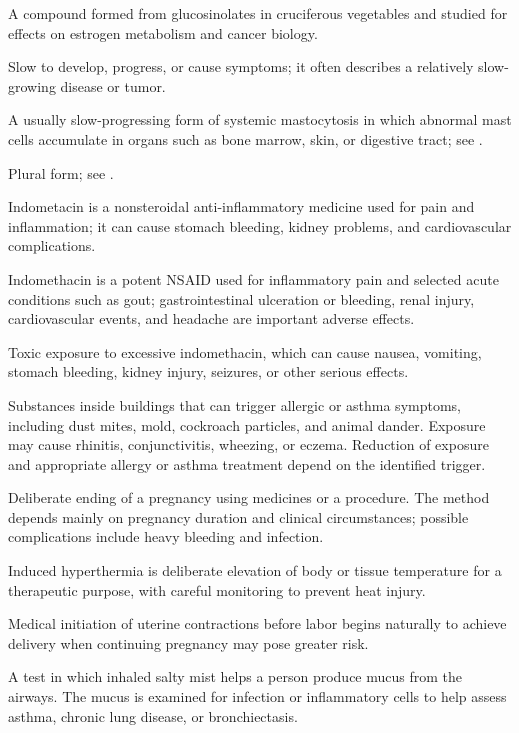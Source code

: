  A compound formed from glucosinolates in cruciferous vegetables and studied for effects on estrogen metabolism and cancer biology.

 Slow to develop, progress, or cause symptoms; it often describes a relatively slow-growing disease or tumor.

 A usually slow-progressing form of systemic mastocytosis in which abnormal mast cells accumulate in organs such as bone marrow, skin, or digestive tract; see .

 Plural form; see .

 Indometacin is a nonsteroidal anti-inflammatory medicine used for pain and inflammation; it can cause stomach bleeding, kidney problems, and cardiovascular complications.

 Indomethacin is a potent NSAID used for inflammatory pain and selected acute conditions such as gout; gastrointestinal ulceration or bleeding, renal injury, cardiovascular events, and headache are important adverse effects.

 Toxic exposure to excessive indomethacin, which can cause nausea, vomiting, stomach bleeding, kidney injury, seizures, or other serious effects.

 Substances inside buildings that can trigger allergic or asthma symptoms, including dust mites, mold, cockroach particles,
and animal dander. Exposure may cause rhinitis, conjunctivitis, wheezing, or eczema. Reduction of exposure and
appropriate allergy or asthma treatment depend on the identified trigger.

 Deliberate ending of a pregnancy using medicines or a procedure. The method depends mainly on pregnancy duration and clinical circumstances; possible complications include heavy bleeding and infection.

 Induced hyperthermia is deliberate elevation of body or tissue temperature for a therapeutic purpose, with careful monitoring to prevent heat injury.

 Medical initiation of uterine contractions before labor begins naturally to achieve delivery when continuing pregnancy may pose greater risk.

 A test in which inhaled salty mist helps a person produce mucus from the airways. The mucus is examined for infection or inflammatory cells to help assess asthma, chronic lung disease, or bronchiectasis.

